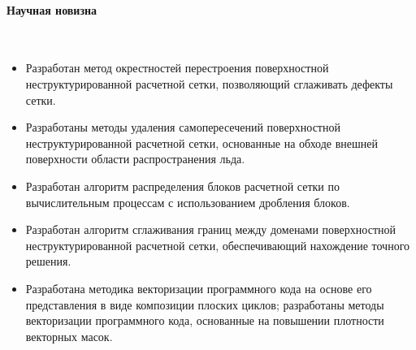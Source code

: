 \paragraph{Научная новизна} \
\begin{itemize}[noitemsep,topsep=0pt,parsep=0pt,partopsep=0pt]
\item Разработан метод окрестностей перестроения поверхностной неструктурированной расчетной сетки, позволяющий сглаживать дефекты сетки.
\item Разработаны методы удаления самопересечений поверхностной неструктурированной расчетной сетки, основанные на обходе внешней поверхности области распространения льда.
\item Разработан алгоритм распределения блоков расчетной сетки по вычислительным процессам с использованием дробления блоков.
\item Разработан алгоритм сглаживания границ между доменами поверхностной неструктурированной расчетной сетки, обеспечивающий нахождение точного решения.
\item Разработана методика векторизации программного кода на основе его представления в виде композиции плоских циклов; разработаны методы векторизации программного кода, основанные на повышении плотности векторных масок.
\end{itemize}